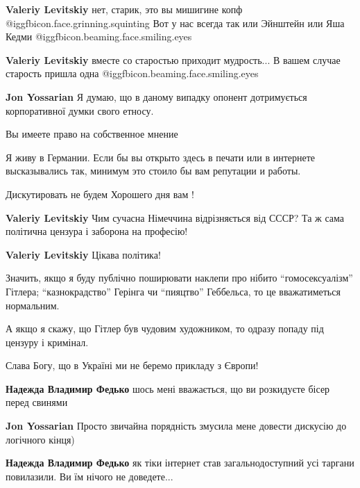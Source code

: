 \begin{itemize}
\begin{itemize}
\begin{itemize} %
\textbf{Valeriy Levitskiy} нет, старик, это вы мишигине копф  @igg{fbicon.face.grinning.squinting} 
Вот у нас всегда так или Эйнштейн или Яша Кедми  @igg{fbicon.beaming.face.smiling.eyes} 

\textbf{Valeriy Levitskiy} вместе со старостью приходит мудрость... В вашем случае старость пришла одна  @igg{fbicon.beaming.face.smiling.eyes} 

\textbf{Jon Yossarian} Я думаю, що в даному випадку опонент дотримується корпоративної думки свого етносу.
\end{itemize} %


Вы имеете право на собственное мнение

Я живу в Германии. Если бы вы открыто здесь в печати или в интернете
высказывались так, минимум это стоило бы вам репутации и работы.

Дискутировать не будем Хорошего дня вам !

\begin{itemize} %
\textbf{Valeriy Levitskiy} Чим сучасна Німеччина відрізняється від СССР? Та ж сама політична цензура і заборона на професію!

\textbf{Valeriy Levitskiy} Цікава політика!

Значить, якщо я буду публічно поширювати наклепи про нібито \enquote{гомосексуалізм}
Гітлера; \enquote{казнокрадство} Герінга чи \enquote{пияцтво} Геббельса, то це вважатиметься
нормальним.

А якщо я скажу, що Гітлер був чудовим художником, то одразу попаду під цензуру
і кримінал.

Слава Богу, що в Україні ми не беремо прикладу з Європи!
\end{itemize} %

\textbf{Надежда Владимир Федько} шось мені вважається, що ви розкидуєте бісер перед свинями

\begin{itemize} %
\textbf{Jon Yossarian} Просто звичайна порядність змусила мене довести дискусію до логічного кінця)

\textbf{Надежда Владимир Федько} як тіки інтернет став загальнодоступний усі таргани повилазили. Ви їм нічого не доведете...
\end{itemize} %


\end{itemize}
\end{itemize}

